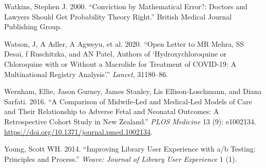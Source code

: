 \documentclass[
  10ptls,
  b5paper]{book}
\newlength{\cslhangindent}
\newenvironment{CSLReferences}[2] %
 {\begin{list}{}{%
  \setlength{\itemindent}{0pt}
  \setlength{\leftmargin}{0pt}
  \setlength{\parsep}{0pt}
  \ifodd #1
   \setlength{\leftmargin}{\cslhangindent}
   \setlength{\itemindent}{-1\cslhangindent}
  \fi
  \setlength{\itemsep}{#2\baselineskip}}}
 {\end{list}}
\begin{document}
\begin{CSLReferences}{1}{0}
Watkins, Stephen J. 2000. {``Conviction by Mathematical Error?: Doctors and Lawyers Should Get Probability Theory Right.''} British Medical Journal Publishing Group.

Watson, J, A Adler, A Agweyu, et al. 2020. {``Open Letter to MR Mehra, SS Desai, f Ruschitzka, and AN Patel, Authors of {`Hydroxychloroquine or Chloroquine with or Without a Macrolide for Treatment of COVID-19: A Multinational Registry Analysis'}.''} \emph{Lancet}, 31180--86.

Wernham, Ellie, Jason Gurney, James Stanley, Lis Ellison-Loschmann, and Diana Sarfati. 2016. {``A Comparison of Midwife-Led and Medical-Led Models of Care and Their Relationship to Adverse Fetal and Neonatal Outcomes: A Retrospective Cohort Study in New Zealand.''} \emph{PLOS Medicine} 13 (9): e1002134. \url{https://doi.org/10.1371/journal.pmed.1002134}.

Young, Scott WH. 2014. {``Improving Library User Experience with a/b Testing: Principles and Process.''} \emph{Weave: Journal of Library User Experience} 1 (1).

\end{CSLReferences}

\newpage
\end{document}
